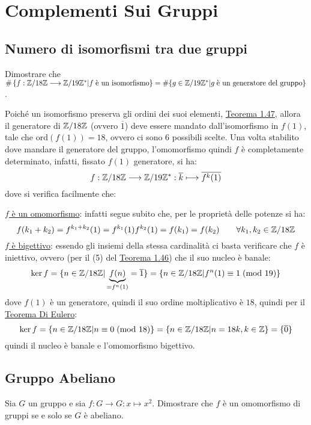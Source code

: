 \documentclass[11pt]{scrartcl}
\begin{document}
\newpage
\appendix
\section{Complementi Sui Gruppi}

\subsection{Numero di isomorfismi tra due gruppi}

\begin{exercise}
Dimostrare che $\#\left\{f : \mathbb Z/18\mathbb Z \longrightarrow \mathbb Z/19\mathbb Z^* | f \; \text{è un isomorfismo}\right\} = \#\{g \in \mathbb Z/19\mathbb Z^* | g \; \text{è un generatore del gruppo}\}$.
\end{exercise}

\begin{soln}
Poiché un isomorfismo preserva gli ordini dei suoi elementi, \hyperref[thm:g_sei]{Teorema 1.47}, allora il generatore di $\mathbb Z/18\mathbb Z$ (ovvero $\overline 1$) deve essere mandato dall'isomorfismo in $f(1)$, tale che $\text{ord}(f(1)) = 18$, ovvero ci sono $6$ possibili scelte. Una volta stabilito dove mandare il generatore del gruppo, l'omomorfismo quindi $f$ è completamente determinato, infatti, fissato $f(1)$ generatore, si ha:
	\[ f : \mathbb Z/18\mathbb Z \longrightarrow \mathbb Z/19\mathbb Z^* : \overline k \longmapsto\overline{f^k(1)}
	\]
dove si verifica facilmente che:
	\begin{itemize}
	\ii \underline{$f$ è un omomorfismo}: infatti segue subito che, per le proprietà delle potenze si ha:
		\[ f(k_1+k_2)=f^{k_1+k_2}(1)=f^{k_1}(1)f^{k_2}(1)=f(k_1)=f(k_2)
		\qquad
		\forall k_1,k_2 \in \mathbb Z/18\mathbb Z
		\]
	\ii \underline{$f$ è bigettivo}: essendo gli insiemi della stessa cardinalità ci basta verificare che $f$ è iniettivo, ovvero (per il (5) del \hyperref[thm:g_quattro]{Teorema 1.46}) che il suo nucleo è banale:
		\[ \ker f = \{n \in \mathbb Z/18\mathbb Z | \underbrace{f(n)}_{= f^n(1)} = \overline 1\} =  \{n \in \mathbb Z/18\mathbb Z | f^n(1) \equiv 1\; \text{(mod 19)}\}
		\]
dove $f(1)$ è un generatore, quindi il suo ordine moltiplicativo è $18$, quindi per il \hyperref[]{Teorema Di Eulero}:
		\[\ker f = \{n \in \mathbb Z/18\mathbb Z | n \equiv 0 \; \text{(mod 18)}\} = \{n \in \mathbb Z/18\mathbb Z | n = 18k, k \in \mathbb Z\} = \{\overline{0}\} 
		\]
quindi il nucleo è banale e l'omomorfismo bigettivo.
	\end{itemize}
\end{soln}

\subsection{Gruppo Abeliano}
\begin{exercise}
\label{A:2}
Sia $G$ un gruppo e sia $f: G \longrightarrow G : x \longmapsto x^2$. Dimostrare che $f$ è un omomorfismo di gruppi se e solo se $G$ è abeliano.
\end{exercise}
\end{document}
